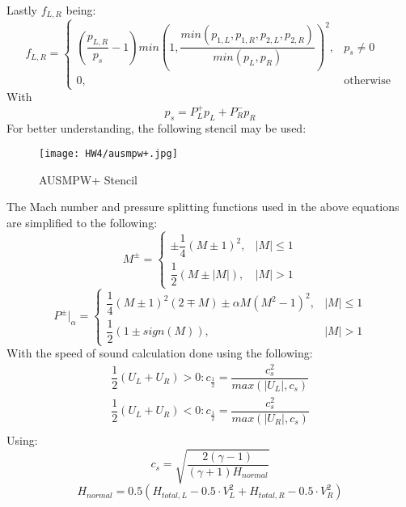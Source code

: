 \documentclass[a4paper, 12pt]{article}
\begin{document}
Lastly $f_{L, R}$ being:
\begin{equation}
    f_{L, R} =
    \begin{cases}
        \left(\dfrac{p_{L,R}}{p_s}-1\right)min\left(1, \dfrac{min(p_{1,L},p_{1,R},p_{2,L},p_{2,R})}{min(p_L,p_R)}\right)^2,& p_s \neq 0\\
        0 , & \text{otherwise}
    \end{cases}
\end{equation}
With
\begin{equation}
    p_s = P^+_Lp_L + P^-_Rp_R
\end{equation}
For better understanding, the following stencil may be used:
\begin{figure}[H]
    \centering
    \texttt{[image: HW4/ausmpw+.jpg]}
    \caption{AUSMPW+ Stencil}
\end{figure}
The Mach number and pressure splitting functions used in the above equations are simplified to the following:
\begin{equation}
    M^\pm =
    \begin{cases}
        \pm\dfrac{1}{4}(M\pm1)^2,& |M| \leq 1\\
        \dfrac{1}{2}(M\pm|M|),& |M|>1
    \end{cases}
\end{equation}
\begin{equation}
    P^\pm|_\alpha =
    \begin{cases}
        \dfrac{1}{4}(M\pm1)^2(2\mp M)\pm\alpha M(M^2-1)^2 ,& |M| \leq 1\\
        \dfrac{1}{2}(1\pm sign(M)) ,& |M| > 1
    \end{cases}
\end{equation}
With the speed of sound calculation done using the following:
\begin{equation}
    \begin{split}
        \dfrac{1}{2}(U_L+U_R) > 0: c_{\frac{1}{2}} = \dfrac{c_s^2}{max(|U_L|,c_s)} \\
        \dfrac{1}{2}(U_L+U_R) < 0: c_{\frac{1}{2}} = \dfrac{c_s^2}{max(|U_R|,c_s)} \\
    \end{split}
\end{equation}
Using:
\begin{equation}
    c_s = \sqrt{\dfrac{2(\gamma-1)}{(\gamma+1)H_{normal}}}
\end{equation}
\begin{equation}
    H_{normal} = 0.5(H_{total,L}-0.5\cdot V_L^2+H_{total,R}-0.5\cdot V_R^2)
\end{equation}
\end{document}
